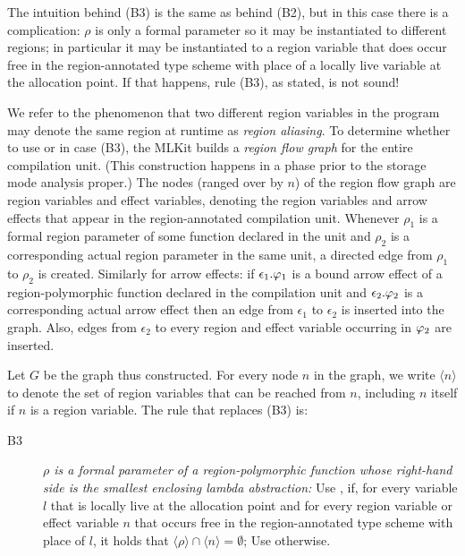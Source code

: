 \documentclass[12pt]{book}
\begin{document}
The intuition behind (B3) is the same as behind (B2), but in this case there is
a complication: $\rho$ is only a formal parameter so it may be instantiated to
different regions; in particular it may be instantiated to a region variable
that does occur free in the region-annotated type scheme with place of a locally
live variable at the allocation point. If that happens, rule (B3), as stated, is
not sound!

We refer to the phenomenon that two different region variables in the
program may denote the same region at runtime as
%
%
%
{\em region aliasing}. To determine whether to use  or  in
case (B3), the MLKit builds a
%
%
\label{region flow graph}%
%
\emph{region flow graph} for the entire compilation unit. (This construction
happens in a phase prior to the storage mode analysis proper.)  The nodes
(ranged over by $n$) of the region flow graph are region variables and effect
variables, denoting the region variables and arrow effects that appear in the
region-annotated compilation unit.  Whenever $\rho_1$ is a formal region
parameter of some function declared in the unit and $\rho_2$ is a corresponding
actual region parameter in the same unit, a directed edge from $\rho_1$ to
$\rho_2$ is created. Similarly for arrow effects: if $\epsilon_1.\varphi_1$ is a
bound arrow effect of a region-polymorphic function declared in the compilation
unit and $\epsilon_2.\varphi_2$ is a corresponding actual arrow effect then an edge
from $\epsilon_1$ to $\epsilon_2$ is inserted into the graph.  Also, edges from
$\epsilon_2$ to every region and effect variable occurring in $\varphi_2$ are
inserted.

Let $G$ be the graph thus constructed.  For every node $n$ in the graph, we
write $\langle n\rangle$ to denote the set of region variables that can be
reached from $n$, including $n$ itself if $n$ is a region variable.  The rule
that replaces (B3) is:
%
%
%
\begin{description}
\item[B3]{\it $\rho$ is a formal parameter of a region-polymorphic function
  whose right-hand side is the smallest enclosing lambda abstraction:} Use
  , if, for every variable $l$ that is locally live at the allocation
  point and for every region variable or effect variable $n$ that occurs free in the
  region-annotated type scheme with place of $l$, it holds that
  $\langle\rho\rangle\cap\langle n \rangle =\emptyset$;
  Use  otherwise.
\end{description}
\medskip
\end{document}
